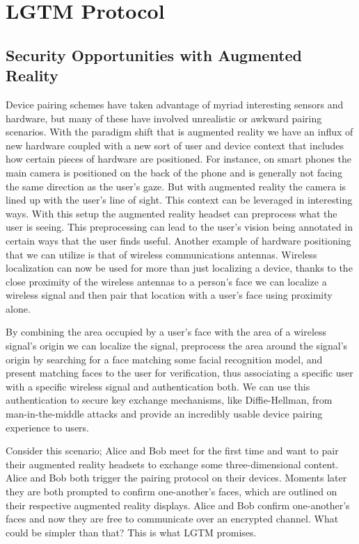 \documentclass[12pt]{report}
\begin{document}
\chapter{LGTM Protocol}
\section{Security Opportunities with Augmented Reality}
Device pairing schemes have taken advantage of myriad interesting sensors and hardware, but many of these have involved unrealistic or awkward pairing scenarios. With the paradigm shift that is augmented reality we have an influx of new hardware coupled with a new sort of user and device context that includes how certain pieces of hardware are positioned. For instance, on smart phones the main camera is positioned on the back of the phone and is generally not facing the same direction as the user's gaze. But with augmented reality the camera is lined up with the user's line of sight. This context can be leveraged in interesting ways. With this setup the augmented reality headset can preprocess what the user is seeing. This preprocessing can lead to the user's vision being annotated in certain ways that the user finds useful. Another example of hardware positioning that we can utilize is that of wireless communications antennas. Wireless localization can now be used for more than just localizing a device, thanks to the close proximity of the wireless antennas to a person's face we can localize a wireless signal and then pair that location with a user's face using proximity alone. 

By combining the area occupied by a user's face with the area of a wireless signal's origin we can localize the signal, preprocess the area around the signal's origin by searching for a face matching some facial recognition model, and present matching faces to the user for verification, thus associating a specific user with a specific wireless signal and authentication both. We can use this authentication to secure key exchange mechanisms, like Diffie-Hellman, from man-in-the-middle attacks and provide an incredibly usable device pairing experience to users. \par

Consider this scenario; Alice and Bob meet for the first time and want to pair their augmented reality headsets to exchange some three-dimensional content. Alice and Bob both trigger the pairing protocol on their devices. Moments later they are both prompted to confirm one-another's faces, which are outlined on their respective augmented reality displays. Alice and Bob confirm one-another's faces and now they are free to communicate over an encrypted channel. What could be simpler than that? This is what LGTM promises. \par
\end{document}
